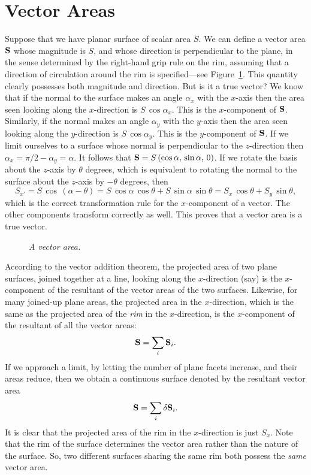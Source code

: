\section{Vector Areas}\label{sect22}
Suppose that we have planar surface of scalar area $S$. We can define a vector
area ${\bf S}$ whose magnitude is $S$, and whose direction is perpendicular to
the plane, in the sense determined  by  the right-hand grip rule on the rim, assuming that a direction of circulation around the rim is specified---see Figure~\ref{f4}.
This quantity clearly possesses both magnitude and direction. But is it a true
vector? We know that if the normal to the surface makes an angle $\alpha_x$ with
the $x$-axis then the area seen looking along the $x$-direction is $S\,\cos\alpha_x$.
This is the $x$-component of ${\bf S}$.
Similarly, if the normal makes an angle $\alpha_y$ with the $y$-axis then the
area seen looking along the $y$-direction is $S\,\cos\alpha_y$. 
This is the $y$-component of ${\bf S}$. If we limit ourselves to a surface whose
normal is perpendicular to the $z$-direction then $\alpha_x = \pi/2-\alpha_y=\alpha$.
It follows that ${\bf S} = S\,(\cos\alpha,\, \sin\alpha,\, 0)$. If we rotate the
basis about the
$z$-axis by $\theta$ degrees, which is equivalent to rotating the normal to
the surface about the $z$-axis by $-\theta$ degrees, then
\begin{equation}\label{e29}
S_{x'} = S\,\cos\,(\alpha-\theta) = S\,\cos\alpha\,\cos\theta + S\,\sin\alpha\,\sin\theta
= S_x\,\cos\theta + S_y\,\sin\theta,
\end{equation}
which is the correct transformation rule for the $x$-component of a vector. The
other components transform correctly as well. This  proves
that a vector area is a
true vector.
\begin{figure}
\epsfysize=1.5in
\centerline{}
\caption{\em A vector area.}\label{f4}
\end{figure}

According to the vector addition theorem, the projected area of two plane surfaces,
joined together at a line, 
looking along the $x$-direction (say) is the $x$-component of the resultant of the vector areas of the two surfaces.
Likewise, for many joined-up plane areas, the projected area in the $x$-direction,
which is the same as the projected area of the {\em rim} in the $x$-direction, is the
$x$-component  of the resultant of all the vector areas:
\begin{equation}
{\bf S} = \sum_i {\bf S}_i.
\end{equation}
If we approach a limit,
by letting the number of plane facets increase, and their areas reduce, then we
obtain a continuous surface denoted by the resultant vector area
\begin{equation}
 {\bf S} = \sum_i \delta  {\bf S}_i.
\end{equation}
It is
clear that the projected area of the rim in the $x$-direction is just $S_x$. 
Note that the rim of the surface determines the vector area rather than the nature of
the surface. So, two different surfaces sharing the same rim both possess the {\em same}
vector area. 

